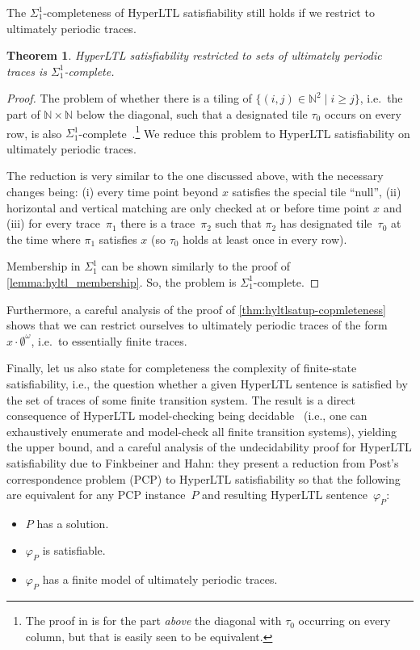 \documentclass[dvipsnames,10pt,a4paper]{amsart}
\newtheorem{thm}{Theorem}[section]
\theoremstyle{definition}
\theoremstyle{remark}
\newcommand{\hyltl}{{HyperLTL}\xspace}
\begin{document}
The $\Sigma^1_1$-completeness of \hyltl satisfiability still holds if we restrict to ultimately periodic traces.

\begin{thm}
\label{thm:hyltlsatup-copmleteness}
  \hyltl satisfiability restricted to sets of ultimately periodic traces is $\Sigma^1_1$-complete.
\end{thm}

\begin{proof}
The problem of whether there is a tiling of $\{(i,j)\in \mathbb{N}^2\mid i\geq j\}$, i.e.\ the part of $\mathbb{N}\times\mathbb{N}$ below the diagonal, such that a designated tile $\tau_0$ occurs on every row, is also $\Sigma_1^1$-complete~\cite{Harel85}.\footnote{The proof in \cite{Harel85} is for the part \emph{above} the diagonal with $\tau_0$ occurring on every column, but that is easily seen to be equivalent.} We reduce this problem to \hyltl satisfiability on ultimately periodic traces.

The reduction is very similar to the one discussed above, with the necessary changes being: (i) every time point beyond $x$ satisfies the special tile ``null'', (ii) horizontal and vertical matching are only checked at or before time point $x$ and (iii) for every trace~$\pi_1$ there is a trace~$\pi_2$ such that $\pi_2$ has designated tile~$\tau_0$ at the time where $\pi_1$ satisfies $x$ (so $\tau_0$ holds at least once in every row).

Membership in $\Sigma_1^1$ can be shown similarly to the proof of \autoref{lemma:hyltl_membership}. So, the problem is $\Sigma^1_1$-complete.
\end{proof}

Furthermore, a careful analysis of the proof of \autoref{thm:hyltlsatup-copmleteness} shows that we can restrict ourselves to ultimately periodic traces of the form~$x\cdot\emptyset^\omega$, i.e.\ to essentially finite traces.

Finally, let us also state for completeness the complexity of finite-state satisfiability, i.e., the question whether a given \hyltl sentence is satisfied by the set of traces of some finite transition system.
The result is a direct consequence of \hyltl model-checking being decidable~\cite{FinkbeinerRS15} (i.e., one can exhaustively enumerate and model-check all finite transition systems), yielding the upper bound, and a careful analysis of the undecidability proof for \hyltl satisfiability due to Finkbeiner and Hahn: they present a reduction from Post's correspondence problem (PCP) to \hyltl satisfiability so that the following are equivalent for any PCP instance~$P$ and resulting \hyltl sentence~$\varphi_P$:
\begin{itemize}
    \item $P$ has a solution.
    \item $\varphi_P$ is satisfiable.
    \item $\varphi_P$ has a finite model of ultimately periodic traces.
\end{itemize}
\end{document}
